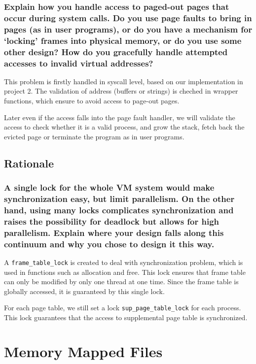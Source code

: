 \documentclass[sigconf, nonacm, balance=false, urlbreakonhyphens=true]{acmart}
\begin{document}
            \subsubsection{Explain how you handle access to paged-out pages that occur during system calls.  Do you use page faults to bring in pages (as in user programs), or do you have a mechanism for `locking' frames into physical memory, or do you use some other design?  How do you gracefully handle attempted accesses to invalid virtual addresses? }
                
                This problem is firstly handled in syscall level, based on our implementation in project 2. The validation of address (buffers or strings) is cheched in wrapper functions, which ensure to avoid access to page-out pages.

                Later even if the access falls into the page fault handler, we will validate the access to check whether it is a valid process, and grow the stack, fetch back the evicted page or terminate the program as in user programs. 
        
        \subsection{Rationale}

            \subsubsection{A single lock for the whole VM system would make synchronization easy, but limit parallelism.  On the other hand, using many locks complicates synchronization and raises the possibility for deadlock but allows for high parallelism.  Explain where your design falls along this continuum and why you chose to design it this way. }
                
                A \texttt{frame\_table\_lock} is created to deal with synchronization problem, which is used in functions such as allocation and free. This lock ensures that frame table can only be modified by only one thread at one time. Since the frame table is globally accessed, it is guaranteed by this single lock. 

                For each page table, we still set a lock \texttt{sup\_page\_table\_lock} for each process. This lock guarantees that the access to supplemental page table is synchronized. 
    
    \section{Memory Mapped Files}
\end{document}
